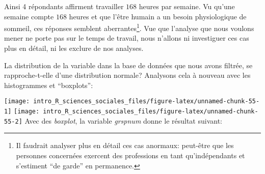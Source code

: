 \documentclass[
]{book}
\newenvironment{Shaded}{\begin{snugshade}}{\end{snugshade}}
\newcommand{\AttributeTok}[1]{\textcolor[rgb]{0.77,0.63,0.00}{#1}}
\newcommand{\CommentTok}[1]{\textcolor[rgb]{0.56,0.35,0.01}{\textit{#1}}}
\newcommand{\DecValTok}[1]{\textcolor[rgb]{0.00,0.00,0.81}{#1}}
\newcommand{\FunctionTok}[1]{\textcolor[rgb]{0.00,0.00,0.00}{#1}}
\newcommand{\NormalTok}[1]{#1}
\newcommand{\SpecialCharTok}[1]{\textcolor[rgb]{0.00,0.00,0.00}{#1}}
\newcommand{\StringTok}[1]{\textcolor[rgb]{0.31,0.60,0.02}{#1}}
\begin{document}
Ainsi 4 répondants affirment travailler \(168\) heures par semaine. Vu qu'une semaine compte \(168\) heures et que l'être humain a un besoin physiologique de sommeil, ces réponses semblent aberrantes\footnote{Il faudrait analyser plus en détail ces cas anormaux: peut-être que les personnes concernées exercent des professions en tant qu'indépendants et s'estiment ``de garde'' en permanence.}. Vue que l'analyse que nous voulons mener ne porte pas sur le temps de travail, nous n'allons ni investiguer ces cas plus en détail, ni les exclure de nos analyses.

La distribution de la variable dans la base de données que nous avons filtrée, se rapproche-t-elle d'une distribution normale? Analysons cela à nouveau avec les histogrammes et ``boxplots'':

\begin{Shaded}
\end{Shaded}

\texttt{[image: intro\_R\_sciences\_sociales\_files/figure-latex/unnamed-chunk-55-1]} \texttt{[image: intro\_R\_sciences\_sociales\_files/figure-latex/unnamed-chunk-55-2]}
Avec des \emph{boxplot}, la variable \emph{grspnum} donne le résultat suivant:
\end{document}
